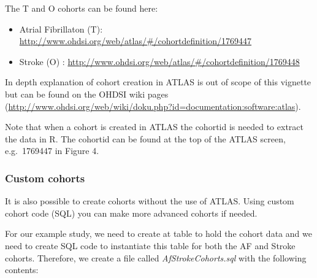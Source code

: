 \documentclass[]{book}
\providecommand{\tightlist}{%
  \setlength{\itemsep}{0pt}\setlength{\parskip}{0pt}}
\begin{document}
The T and O cohorts can be found here:

\begin{itemize}
\tightlist
\item
  Atrial Fibrillaton (T):
  \url{http://www.ohdsi.org/web/atlas/\#/cohortdefinition/1769447}
\item
  Stroke (O) :
  \url{http://www.ohdsi.org/web/atlas/\#/cohortdefinition/1769448}
\end{itemize}

In depth explanation of cohort creation in ATLAS is out of scope of this
vignette but can be found on the OHDSI wiki pages
(\url{http://www.ohdsi.org/web/wiki/doku.php?id=documentation:software:atlas}).

Note that when a cohort is created in ATLAS the cohortid is needed to
extract the data in R. The cohortid can be found at the top of the ATLAS
screen, e.g.~1769447 in Figure 4.

\subsubsection{Custom cohorts}\label{custom-cohorts}

It is also possible to create cohorts without the use of ATLAS. Using
custom cohort code (SQL) you can make more advanced cohorts if needed.

For our example study, we need to create at table to hold the cohort
data and we need to create SQL code to instantiate this table for both
the AF and Stroke cohorts. Therefore, we create a file called
\emph{AfStrokeCohorts.sql} with the following contents:
\end{document}
